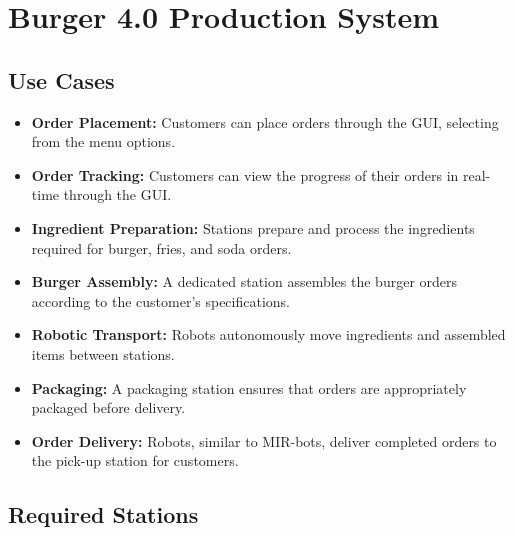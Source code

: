 \documentclass[conference]{IEEEtran}
\begin{document}
\maketitle
\IEEEpubidadjcol


\section{Burger 4.0 Production System}

\subsection{Use Cases}

\begin{itemize}
    \item \textbf{Order Placement:} Customers can place orders through the GUI, selecting from the menu options.
    \item \textbf{Order Tracking:} Customers can view the progress of their orders in real-time through the GUI.
    \item \textbf{Ingredient Preparation:} Stations prepare and process the ingredients required for burger, fries, and soda orders.
    \item \textbf{Burger Assembly:} A dedicated station assembles the burger orders according to the customer's specifications.
    \item \textbf{Robotic Transport:} Robots autonomously move ingredients and assembled items between stations.
    \item \textbf{Packaging:} A packaging station ensures that orders are appropriately packaged before delivery.
    \item \textbf{Order Delivery:} Robots, similar to MIR-bots, deliver completed orders to the pick-up station for customers.
\end{itemize}

\subsection{Required Stations}
\end{document}
